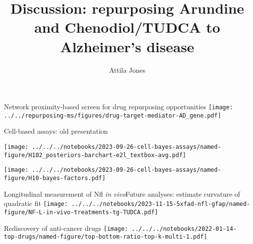 \documentclass[aspectratio=169]{beamer}
\title{Discussion: repurposing Arundine and Chenodiol/TUDCA to Alzheimer's
disease}
\subtitle{}
\author{Attila Jones}
\date{}
\begin{document}
\titlepage

\begin{frame}[label=network]{Network proximity-based screen for drug repurposing
  opportunities}
\texttt{[image: ../../repurposing-ms/figures/drug-target-mediator-AD\_gene.pdf]}
\end{frame}

\begin{frame}{Cell-based assays: old presentation}
\begin{center}
\texttt{[image: ../../../notebooks/2023-09-26-cell-bayes-assays/named-figure/H102\_posteriors-barchart-e2l\_textbox-avg.pdf]}
\end{center}
\end{frame}

\begin{frame}[plain]%
\begin{center}
\texttt{[image: ../../../notebooks/2023-09-26-cell-bayes-assays/named-figure/H10-bayes-factors.pdf]}
\end{center}
\end{frame}

\begin{frame}{Longitudinal measurement of Nfl \emph{in vivo}}{Future analyses:
    estimate curvature of quadratic fit}
\texttt{[image: ../../../notebooks/2023-11-15-5xfad-nfl-gfap/named-figure/NF-L-in-vivo-treatments-tg-TUDCA.pdf]}
\end{frame}


\begin{frame}{Rediscovery of anti-cancer drugs}
\texttt{[image: ../../../notebooks/2022-01-14-top-drugs/named-figure/top-bottom-ratio-top-k-multi-1.pdf]}
\end{frame}
\end{document}
